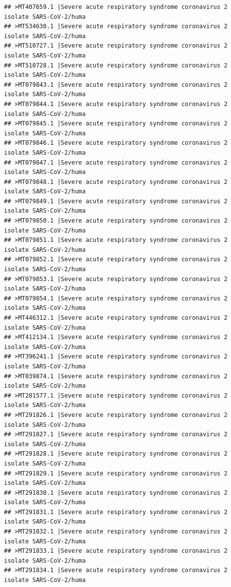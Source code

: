 \documentclass[
]{book}
\begin{document}
\begin{verbatim}
## >MT407659.1 |Severe acute respiratory syndrome coronavirus 2 isolate SARS-CoV-2/huma
## >MT534630.1 |Severe acute respiratory syndrome coronavirus 2 isolate SARS-CoV-2/huma
## >MT510727.1 |Severe acute respiratory syndrome coronavirus 2 isolate SARS-CoV-2/huma
## >MT510728.1 |Severe acute respiratory syndrome coronavirus 2 isolate SARS-CoV-2/huma
## >MT079843.1 |Severe acute respiratory syndrome coronavirus 2 isolate SARS-CoV-2/huma
## >MT079844.1 |Severe acute respiratory syndrome coronavirus 2 isolate SARS-CoV-2/huma
## >MT079845.1 |Severe acute respiratory syndrome coronavirus 2 isolate SARS-CoV-2/huma
## >MT079846.1 |Severe acute respiratory syndrome coronavirus 2 isolate SARS-CoV-2/huma
## >MT079847.1 |Severe acute respiratory syndrome coronavirus 2 isolate SARS-CoV-2/huma
## >MT079848.1 |Severe acute respiratory syndrome coronavirus 2 isolate SARS-CoV-2/huma
## >MT079849.1 |Severe acute respiratory syndrome coronavirus 2 isolate SARS-CoV-2/huma
## >MT079850.1 |Severe acute respiratory syndrome coronavirus 2 isolate SARS-CoV-2/huma
## >MT079851.1 |Severe acute respiratory syndrome coronavirus 2 isolate SARS-CoV-2/huma
## >MT079852.1 |Severe acute respiratory syndrome coronavirus 2 isolate SARS-CoV-2/huma
## >MT079853.1 |Severe acute respiratory syndrome coronavirus 2 isolate SARS-CoV-2/huma
## >MT079854.1 |Severe acute respiratory syndrome coronavirus 2 isolate SARS-CoV-2/huma
## >MT446312.1 |Severe acute respiratory syndrome coronavirus 2 isolate SARS-CoV-2/huma
## >MT412134.1 |Severe acute respiratory syndrome coronavirus 2 isolate SARS-CoV-2/huma
## >MT396241.1 |Severe acute respiratory syndrome coronavirus 2 isolate SARS-CoV-2/huma
## >MT039874.1 |Severe acute respiratory syndrome coronavirus 2 isolate SARS-CoV-2/huma
## >MT281577.1 |Severe acute respiratory syndrome coronavirus 2 isolate SARS-CoV-2/huma
## >MT291826.1 |Severe acute respiratory syndrome coronavirus 2 isolate SARS-CoV-2/huma
## >MT291827.1 |Severe acute respiratory syndrome coronavirus 2 isolate SARS-CoV-2/huma
## >MT291828.1 |Severe acute respiratory syndrome coronavirus 2 isolate SARS-CoV-2/huma
## >MT291829.1 |Severe acute respiratory syndrome coronavirus 2 isolate SARS-CoV-2/huma
## >MT291830.1 |Severe acute respiratory syndrome coronavirus 2 isolate SARS-CoV-2/huma
## >MT291831.1 |Severe acute respiratory syndrome coronavirus 2 isolate SARS-CoV-2/huma
## >MT291832.1 |Severe acute respiratory syndrome coronavirus 2 isolate SARS-CoV-2/huma
## >MT291833.1 |Severe acute respiratory syndrome coronavirus 2 isolate SARS-CoV-2/huma
## >MT291834.1 |Severe acute respiratory syndrome coronavirus 2 isolate SARS-CoV-2/huma

\end{verbatim}
\end{document}
